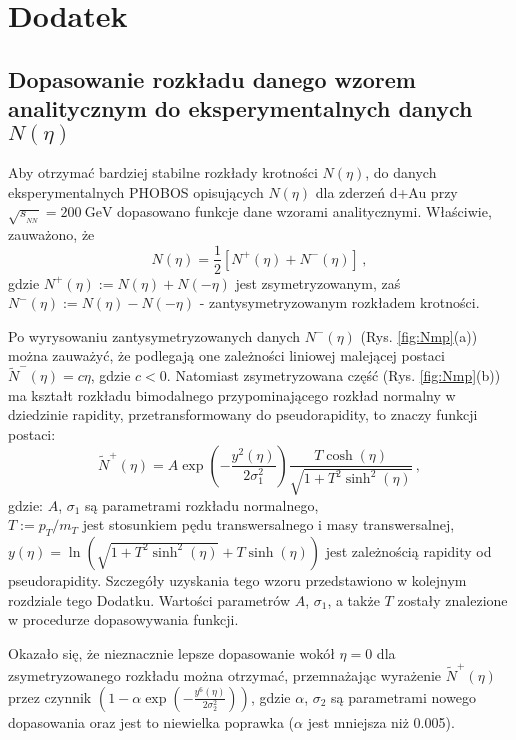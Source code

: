 \documentclass[a4paper,12pt]{article}
\begin{document}
\newpage
\appendix
\section{Dodatek}
\subsection{Dopasowanie rozkładu danego wzorem analitycznym do eksperymentalnych danych $N(\eta)$} \label{fity}
Aby otrzymać bardziej stabilne rozkłady krotności $N(\eta)$, do danych eksperymentalnych PHOBOS opisujących $N(\eta)$ dla zderzeń d+Au przy $\sqrt{s_{_{NN}}} = 200~\text{GeV}$ \cite{Back:2004mr} dopasowano funkcje dane wzorami analitycznymi. Właściwie, zauważono, że
\begin{equation}
N(\eta) = \frac{1}{2}\left[N^+(\eta) + N^-(\eta)\right]\,,
\end{equation}
gdzie $N^+(\eta) := N(\eta)+N(-\eta)$ jest zsymetryzowanym, zaś \\
$N^-(\eta) := N(\eta)-N(-\eta)$ - zantysymetryzowanym rozkładem krotności.

Po wyrysowaniu zantysymetryzowanych danych $N^-(\eta)$ (Rys. \ref{fig:Nmp}(a)) można zauważyć, że podlegają one zależności liniowej malejącej postaci $\widetilde{N}^-(\eta) = c\eta$, gdzie $c < 0$. Natomiast zsymetryzowana część (Rys. \ref{fig:Nmp}(b)) ma kształt rozkładu bimodalnego przypominającego rozkład normalny w dziedzinie rapidity, przetransformowany do pseudorapidity, to znaczy funkcji postaci:
\begin{equation}\label{eq:fit-symmetr}
\widetilde{N}^+(\eta) = A \exp \left(- \frac{y^2(\eta)}{2 \sigma_1^2} \right) \frac{T \cosh(\eta)}{\sqrt{1 + T^2 \sinh^2(\eta)}}\,,
\end{equation}
gdzie: $A$, $\sigma_1$ są parametrami rozkładu normalnego, \\
$T := p_T/m_T$ jest stosunkiem pędu transwersalnego i masy transwersalnej, \\
$y(\eta) = \ln\left( \sqrt{1 + T^2 \sinh^2(\eta)} + T \sinh(\eta) \right)$ jest zależnością rapidity od pseudorapidity. Szczegóły uzyskania tego wzoru przedstawiono w kolejnym rozdziale tego Dodatku. Wartości parametrów $A$, $\sigma_1$, a także $T$ zostały znalezione w procedurze dopasowywania funkcji.

Okazało się, że nieznacznie lepsze dopasowanie wokół $\eta = 0$ dla zsymetryzowanego rozkładu można otrzymać, przemnażając wyrażenie $\widetilde{N}^+(\eta)$ przez czynnik $\left(1 - \alpha\exp\left(- \frac{y^6(\eta)}{2\sigma_2^2}\right)\right)$, gdzie $\alpha$, $\sigma_2$ są parametrami nowego dopasowania oraz jest to niewielka poprawka ($\alpha$ jest mniejsza niż 0.005).
\end{document}
